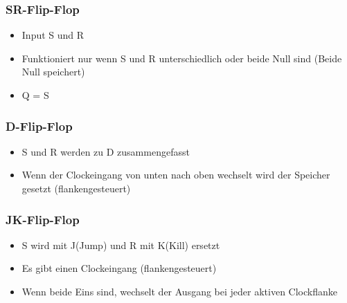 \documentclass[8pt,a4paper]{scrartcl}
\begin{document}
\begin{multicols*}{3}
				\subsubsection{SR-Flip-Flop}
					\begin{itemize}\itemsep0pt
						\item Input S und R
						\item Funktioniert nur wenn S und R unterschiedlich oder beide Null sind (Beide Null speichert)
						\item Q = S
					\end{itemize}
					
				\subsubsection{D-Flip-Flop}
					\begin{itemize}\itemsep0pt
						\item S und R werden zu D zusammengefasst
						\item Wenn der Clockeingang von unten nach oben wechselt wird der Speicher gesetzt (flankengesteuert)
					\end{itemize}
					
				\subsubsection{JK-Flip-Flop}
					\begin{itemize}\itemsep0pt
						\item S wird mit J(Jump) und R mit K(Kill) ersetzt
						\item Es gibt einen Clockeingang (flankengesteuert)
						\item Wenn beide Eins sind, wechselt der Ausgang bei jeder aktiven Clockflanke
					\end{itemize}
					

\end{multicols*}
\end{document}
